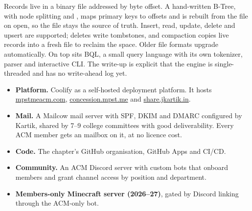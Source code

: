 \begin{facts}
\end{facts}

Records live in a binary file addressed by byte offset. A hand-written B-Tree, with node splitting
and , maps primary keys to offsets and is rebuilt from the file on open, so the
file stays the source of truth. Insert, read, update, delete and upsert are supported; deletes write
tombstones, and compaction copies live records into a fresh file to reclaim the space. Older file
formats upgrade automatically. On top sits BQL, a small query language with its own tokenizer,
parser and interactive CLI. The write-up is explicit that the engine is single-threaded and has no
write-ahead log yet.


\begin{itemize}
  \item \textbf{Platform.} Coolify as a self-hosted deployment platform. It hosts
        \href{https://mpstmeacm.com}{mpstmeacm.com}, \href{https://concession.mpst.me}{concession.mpst.me}
        and \href{https://share.jkartik.in}{share.jkartik.in}.
  \item \textbf{Mail.} A Mailcow mail server with SPF, DKIM and DMARC configured by Kartik, shared by
        7--9 college committees with good deliverability. Every ACM member gets an
         mailbox on it, at no licence cost.
  \item \textbf{Code.} The chapter's GitHub organisation, GitHub Apps and CI/CD.
  \item \textbf{Community.} An ACM Discord server with custom bots that onboard members and grant
        channel access by position and department.
  \item \textbf{Members-only Minecraft server (2026--27)}, gated by Discord linking through the
        ACM-only bot.
\end{itemize}

